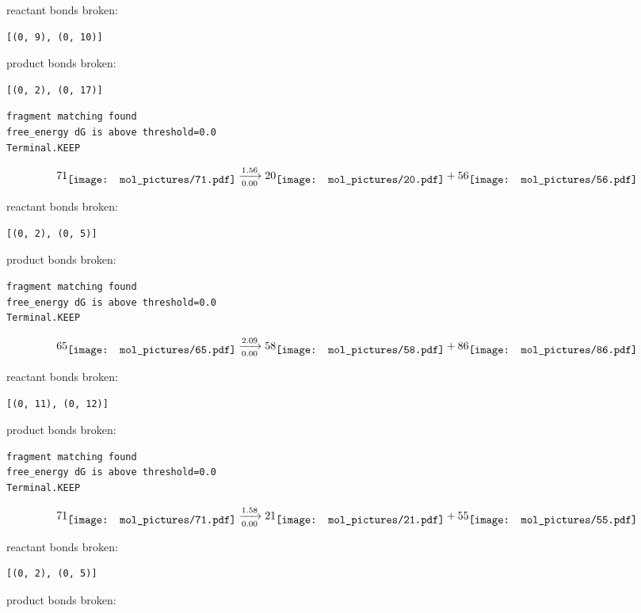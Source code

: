 \documentclass{article}
\begin{document}
reactant bonds broken:\begin{verbatim}
[(0, 9), (0, 10)]
\end{verbatim}
product bonds broken:\begin{verbatim}
[(0, 2), (0, 17)]
\end{verbatim}




\vspace{1cm}
\begin{verbatim}
fragment matching found
free_energy dG is above threshold=0.0
Terminal.KEEP
\end{verbatim}
$$
71
\raisebox{-.5\height}{\texttt{[image: mol\_pictures/71.pdf]}}
\xrightarrow[0.00]{1.56}
20
\raisebox{-.5\height}{\texttt{[image: mol\_pictures/20.pdf]}}
+
56
\raisebox{-.5\height}{\texttt{[image: mol\_pictures/56.pdf]}}
$$


reactant bonds broken:\begin{verbatim}
[(0, 2), (0, 5)]
\end{verbatim}
product bonds broken:



\vspace{1cm}
\begin{verbatim}
fragment matching found
free_energy dG is above threshold=0.0
Terminal.KEEP
\end{verbatim}
$$
65
\raisebox{-.5\height}{\texttt{[image: mol\_pictures/65.pdf]}}
\xrightarrow[0.00]{2.09}
58
\raisebox{-.5\height}{\texttt{[image: mol\_pictures/58.pdf]}}
+
86
\raisebox{-.5\height}{\texttt{[image: mol\_pictures/86.pdf]}}
$$


reactant bonds broken:\begin{verbatim}
[(0, 11), (0, 12)]
\end{verbatim}
product bonds broken:



\vspace{1cm}
\begin{verbatim}
fragment matching found
free_energy dG is above threshold=0.0
Terminal.KEEP
\end{verbatim}
$$
71
\raisebox{-.5\height}{\texttt{[image: mol\_pictures/71.pdf]}}
\xrightarrow[0.00]{1.58}
21
\raisebox{-.5\height}{\texttt{[image: mol\_pictures/21.pdf]}}
+
55
\raisebox{-.5\height}{\texttt{[image: mol\_pictures/55.pdf]}}
$$


reactant bonds broken:\begin{verbatim}
[(0, 2), (0, 5)]
\end{verbatim}
product bonds broken:
\end{document}
